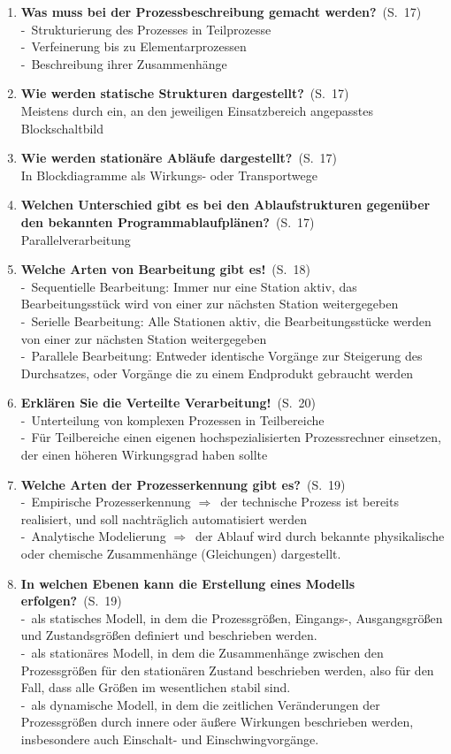 \documentclass[a4paper,12pt]{article}
\newcommand{\question}[3]{\pagebreak[3]\item {\textbf{#1?}}\ (S.\ #2)#3}
\newcommand{\statement}[3]{\pagebreak[3]\item {\textbf{#1!}}\ (S.\ #2)#3}
\newcommand{\catchword}[1]{\\-\ #1}
\newcommand{\normaltext}[1]{\\#1}
\newcommand{\resultol}[1]{ $\Rightarrow$\ #1}
\newcommand{\page}[1]{#1}
\begin{document}
\begin{enumerate}
  \question{Was muss bei der Prozessbeschreibung gemacht werden}{\page{17}}
  {
    \catchword{Strukturierung des Prozesses in Teilprozesse}
    \catchword{Verfeinerung bis zu Elementarprozessen}
    \catchword{Beschreibung ihrer Zusammenhänge}
  }

  \question{Wie werden statische Strukturen dargestellt}{\page{17}}
  {
    \normaltext{Meistens durch ein, an den jeweiligen Einsatzbereich angepasstes Blockschaltbild}
  }

  \question{Wie werden stationäre Abläufe dargestellt}{\page{17}}
  {
    \normaltext{In Blockdiagramme als Wirkungs- oder Transportwege}
  }

  \question{Welchen Unterschied gibt es bei den Ablaufstrukturen gegenüber
            den bekannten Programmablaufplänen}{\page{17}}
  {
    \normaltext{Parallelverarbeitung}
  }

  \statement{Welche Arten von Bearbeitung gibt es}{\page{18}}
  {
    \catchword{Sequentielle Bearbeitung: Immer nur eine Station aktiv, das Bearbeitungsstück wird
               von einer zur nächsten Station weitergegeben}
    \catchword{Serielle Bearbeitung: Alle Stationen aktiv, die Bearbeitungsstücke werden von einer
               zur nächsten Station weitergegeben}
    \catchword{Parallele Bearbeitung: Entweder identische Vorgänge zur Steigerung des Durchsatzes,
               oder Vorgänge die zu einem Endprodukt gebraucht werden}
  }

  \statement{Erklären Sie die Verteilte Verarbeitung}{\page{20}}
  {
    \catchword{Unterteilung von komplexen Prozessen in Teilbereiche}
    \catchword{Für Teilbereiche einen eigenen hochspezialisierten Prozessrechner einsetzen,
               der einen höheren Wirkungsgrad haben sollte}
  }

  \question{Welche Arten der Prozesserkennung gibt es}{\page{19}}
  {
    \catchword{Empirische Prozesserkennung \resultol der technische Prozess ist bereits realisiert, und soll 
    nachträglich automatisiert werden}
    \catchword{Analytische Modelierung \resultol der Ablauf wird durch bekannte physikalische oder chemische
    Zusammenhänge (Gleichungen) dargestellt. }
  }

  \question{In welchen Ebenen kann die Erstellung eines Modells erfolgen}{\page{19}}
  {
    \catchword{als statisches Modell, in dem die Prozessgrößen, Eingangs-, Ausgangsgrößen und Zustandsgrößen
               definiert und beschrieben werden.}
    \catchword{als stationäres Modell, in dem die Zusammenhänge zwischen den Prozessgrößen für den stationären 
               Zustand beschrieben werden, also für den Fall, dass alle Größen im wesentlichen stabil sind.}
    \catchword{als dynamische Modell, in dem die zeitlichen Veränderungen der Prozessgrößen durch
               innere oder äußere Wirkungen beschrieben werden, insbesondere auch Einschalt- 
               und Einschwingvorgänge.}
  }


\end{enumerate}
\end{document}
